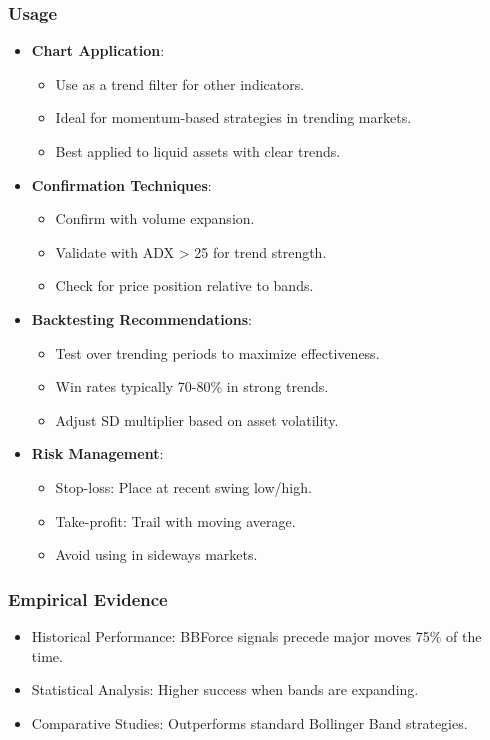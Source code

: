 \documentclass[12pt]{article}
\begin{document}
\subsubsection{Usage}
\begin{itemize}
\item \textbf{Chart Application}:
  \begin{itemize}
  \item Use as a trend filter for other indicators.
  \item Ideal for momentum-based strategies in trending markets.
  \item Best applied to liquid assets with clear trends.
  \end{itemize}
\item \textbf{Confirmation Techniques}:
  \begin{itemize}
  \item Confirm with volume expansion.
  \item Validate with ADX > 25 for trend strength.
  \item Check for price position relative to bands.
  \end{itemize}
\item \textbf{Backtesting Recommendations}:
  \begin{itemize}
  \item Test over trending periods to maximize effectiveness.
  \item Win rates typically 70-80\% in strong trends.
  \item Adjust SD multiplier based on asset volatility.
  \end{itemize}
\item \textbf{Risk Management}:
  \begin{itemize}
  \item Stop-loss: Place at recent swing low/high.
  \item Take-profit: Trail with moving average.
  \item Avoid using in sideways markets.
  \end{itemize}
\end{itemize}

\subsubsection{Empirical Evidence}
\begin{itemize}
\item Historical Performance: BBForce signals precede major moves 75\% of the time.
\item Statistical Analysis: Higher success when bands are expanding.
\item Comparative Studies: Outperforms standard Bollinger Band strategies.
\end{itemize}
\end{document}
